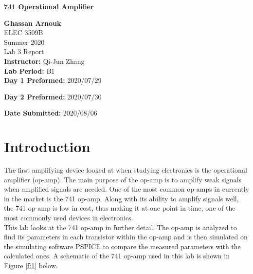 \documentclass{article}
\begin{document}
	\begin{titlepage}
		\begin{center}
			\vspace{1cm}
			{\LARGE\textbf{741 Operational Amplifier}}
			
			\vspace{1.5cm}
			\textbf{\large Ghassan Arnouk}\\
			
			\vspace{1cm}
			\large ELEC 3509B\\
			\large Summer 2020\\
			\large Lab 3 Report\\
			
			
			\vspace{2cm}
			\textbf{Instructor:} Qi-Jun Zhang\\
			
			
			\vspace{1cm}
			\textbf{Lab Period:} B1\\
			
			\vspace{0.1cm}
			\textbf{Day 1 Preformed:} 2020/07/29
			
			\vspace{0.1cm}
			\textbf{Day 2 Preformed:} 2020/07/30
		
			\vspace{1cm}
			\textbf{Date Submitted:} 2020/08/06\\			
		\end{center}
	\end{titlepage}
	
	\pagebreak
	
	\tableofcontents
	\pagebreak
	
	\listoftables
	\pagebreak
	
	\listoffigures
	\pagebreak
	
	\section{Introduction}
	The first amplifying device looked at when studying electronics is the operational amplifier (op-amp). The main purpose of the op-amp is to amplify weak signals when amplified signals are needed. One of the most common op-amps in currently in the market is the 741 op-amp. Along with its ability to amplify signals well, the 741 op-amp is low in cost, thus making it at one point in time, one of the most commonly used devices in electronics.\\
	This lab looks at the 741 op-amp in further detail. The op-amp is analyzed to find its parameters in each transistor within the op-amp and is then simulated on the simulating software PSPICE to compare the measured parameters with the calculated ones. A schematic of the 741 op-amp used in this lab is shown in Figure \ref{f:1} below.
	
\end{document}
